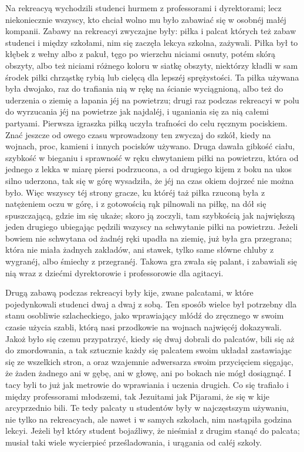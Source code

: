 \documentclass{book}
\begin{document}
Na rekreacyą wychodzili studenci hurmem z professorami i dyrektorami; lecz niekoniecznie wszyscy, kto chciał wolno mu było zabawiać się w osobnéj małéj kompanii. Zabawy na rekreacyi zwyczajne były: piłka i palcat których też zabaw studenci i między szkołami, nim się zaczęła lekcya szkolna, zażywali. Piłka był to kłębek z wełny albo z pakuł, tęgo po wierzchu niciami osnuty, potém skórą obszyty, albo też niciami różnego koloru w siatkę obszyty, niektórzy kładli w sam środek piłki chrząstkę rybią lub cielęcą dla lepszéj sprężystości. Ta piłka używana była dwojako, raz do trafiania nią w rękę na ścianie wyciągnioną, albo też do uderzenia o ziemię a łapania jéj na powietrzu; drugi raz podczas rekreacyi w polu do wyrzucania jéj na powietrze jak najdaléj, i uganiania się za nią całemi partyami. Pierwsza igraszka piłką uczyła trafności do celu ręcznym pociskiem. Znać jeszcze od owego czasu wprowadzony ten zwyczaj do szkół, kiedy na wojnach, proc, kamieni i innych pocisków używano. Druga dawała gibkość ciału, szybkość w bieganiu i sprawność w ręku chwytaniem piłki na powietrzu, która od jednego z lekka w miarę piersi podrzucona, a od drugiego kijem z boku na ukos silno uderzona, tak się w górę wysadziła, że jéj na czas okiem dojrzeć nie można było. Więc wszyscy téj strony gracze, ku któréj taż piłka rzuconą była z natężeniem oczu w górę, i z gotowością rąk pilnowali na piłkę, na dół się spuszczającą, gdzie im się ukaże; skoro ją zoczyli, tam szybkością jak największą jeden drugiego ubiegając pędzili wszyscy na schwytanie piłki na powietrzu. Jeżeli bowiem nie schwytana od żadnéj ręki upadła na ziemię, już była gra przegrana; która nie miała żadnych zakładów, ani stawek, tylko same słówne chluby z wygranéj, albo śmiechy z przegranéj. Takowa gra zwała się palant, i zabawiali się nią wraz z dziećmi dyrektorowie i professorowie dla agitacyi.

Drugą zabawą podczas rekreacyi były kije, zwane palcatami, w które pojedynkowali studenci dwaj a dwaj z sobą. Ten sposób wielce był potrzebny dla stanu osobliwie szlacheckiego, jako wprawiający młódź do zręcznego w swoim czasie użycia szabli, którą nasi przodkowie na wojnach najwięcéj dokazywali. Jakoż było się czemu przypatrzyć, kiedy się dwaj dobrali do palcatów, bili się aż do zmordowania, a tak sztucznie każdy się palcatem swoim układał zastawiając się ze wszelkich stron, a oraz wzajemnie adwersarza swoim przycięciem sięgając, że żaden żadnego ani w gębę, ani w głowę, ani po bokach nie mógł dosiągnąć. I tacy byli to już jak metrowie do wprawiania i uczenia drugich. Co się trafiało i między professorami młodszemi, tak Jezuitami jak Pijarami, że się w kije arcyprzednio bili. Te tedy palcaty u studentów były w najczęstszym używaniu, nie tylko na rekreacyach, ale nawet i w samych szkołach, nim nastąpiła godzina lekcyi. Jeżeli był który student bojaźliwy, że nieśmiał z drugim stanąć do palcata; musiał taki wiele wycierpieć prześladowania, i urągania od całéj szkoły.
\end{document}
